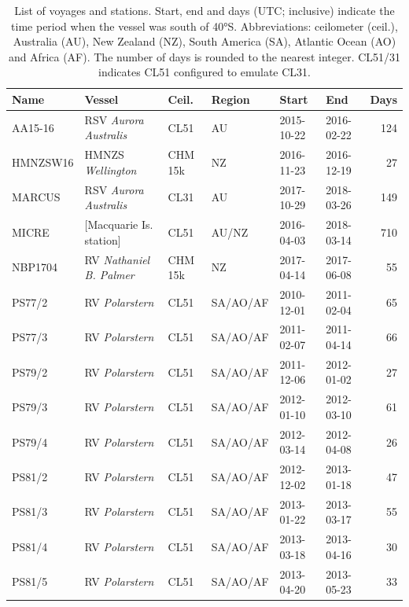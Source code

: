 \documentclass[12pt,a4paper]{article}
\begin{document}
\begin{table}
\caption{List of voyages and stations. Start, end and days (UTC; inclusive) indicate the time period when the vessel was south of 40°S. Abbreviations: ceilometer (ceil.), Australia (AU), New Zealand (NZ), South America (SA), Atlantic Ocean (AO) and Africa (AF). The number of days is rounded to the nearest integer. CL51/31 indicates CL51 configured to emulate CL31.}
\label{tab:voyages}
\small
\begin{tabular}{llllllr}
\textbf{Name} & \textbf{Vessel} & \textbf{Ceil.} & \textbf{Region} & \textbf{Start} & \textbf{End} & \textbf{Days}\\
\hline
AA15-16  & RSV \emph{Aurora Australis}   & CL51    & AU       & 2015-10-22 & 2016-02-22 & 124 \\
HMNZSW16 & HMNZS \emph{Wellington}       & CHM 15k & NZ       & 2016-11-23 & 2016-12-19 & 27 \\
MARCUS   & RSV \emph{Aurora Australis}   & CL31    & AU       & 2017-10-29 & 2018-03-26 & 149 \\
MICRE    & [Macquarie Is. station]       & CL51    & AU/NZ    & 2016-04-03 & 2018-03-14 & 710 \\
NBP1704  & RV \emph{Nathaniel B. Palmer} & CHM 15k & NZ       & 2017-04-14 & 2017-06-08 & 55 \\
PS77/2   & RV \emph{Polarstern}          & CL51    & SA/AO/AF & 2010-12-01 & 2011-02-04 & 65 \\
PS77/3   & RV \emph{Polarstern}          & CL51    & SA/AO/AF & 2011-02-07 & 2011-04-14 & 66 \\
PS79/2   & RV \emph{Polarstern}          & CL51    & SA/AO/AF & 2011-12-06 & 2012-01-02 & 27 \\
PS79/3   & RV \emph{Polarstern}          & CL51    & SA/AO/AF & 2012-01-10 & 2012-03-10 & 61 \\
PS79/4   & RV \emph{Polarstern}          & CL51    & SA/AO/AF & 2012-03-14 & 2012-04-08 & 26 \\
PS81/2   & RV \emph{Polarstern}          & CL51    & SA/AO/AF & 2012-12-02 & 2013-01-18 & 47 \\
PS81/3   & RV \emph{Polarstern}          & CL51    & SA/AO/AF & 2013-01-22 & 2013-03-17 & 55 \\
PS81/4   & RV \emph{Polarstern}          & CL51    & SA/AO/AF & 2013-03-18 & 2013-04-16 & 30 \\
PS81/5   & RV \emph{Polarstern}          & CL51    & SA/AO/AF & 2013-04-20 & 2013-05-23 & 33 \\

\end{tabular}
\end{table}
\end{document}
